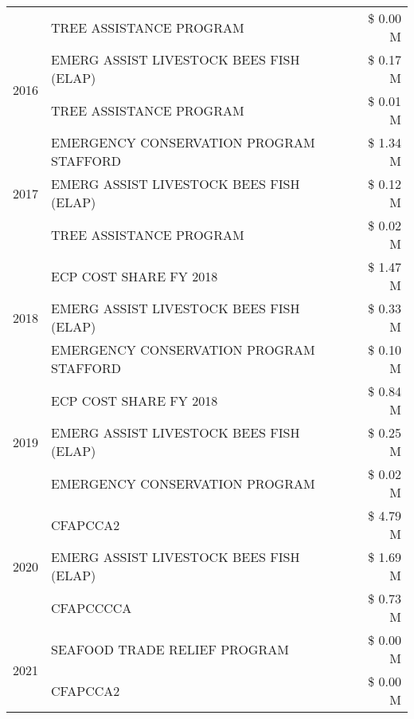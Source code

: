 \begin{tabular}{llr}
 & TREE ASSISTANCE PROGRAM & \$ 0.00 M \\
\cline{1-3}
\multirow[t]{2}{*}{2016} & EMERG ASSIST LIVESTOCK BEES FISH (ELAP)       & \$ 0.17 M \\
 & TREE ASSISTANCE PROGRAM                       & \$ 0.01 M \\
\cline{1-3}
\multirow[t]{3}{*}{2017} & EMERGENCY CONSERVATION PROGRAM STAFFORD & \$ 1.34 M \\
 & EMERG ASSIST LIVESTOCK BEES FISH (ELAP) & \$ 0.12 M \\
 & TREE ASSISTANCE PROGRAM & \$ 0.02 M \\
\cline{1-3}
\multirow[t]{3}{*}{2018} & ECP COST SHARE FY 2018 & \$ 1.47 M \\
 & EMERG ASSIST LIVESTOCK BEES FISH (ELAP) & \$ 0.33 M \\
 & EMERGENCY CONSERVATION PROGRAM STAFFORD & \$ 0.10 M \\
\cline{1-3}
\multirow[t]{3}{*}{2019} & ECP COST SHARE FY 2018 & \$ 0.84 M \\
 & EMERG ASSIST LIVESTOCK BEES FISH (ELAP) & \$ 0.25 M \\
 & EMERGENCY CONSERVATION PROGRAM & \$ 0.02 M \\
\cline{1-3}
\multirow[t]{3}{*}{2020} & CFAPCCA2 & \$ 4.79 M \\
 & EMERG ASSIST LIVESTOCK BEES FISH (ELAP) & \$ 1.69 M \\
 & CFAPCCCCA & \$ 0.73 M \\
\cline{1-3}
\multirow[t]{2}{*}{2021} & SEAFOOD TRADE RELIEF PROGRAM & \$ 0.00 M \\
 & CFAPCCA2 & \$ 0.00 M \\
\cline{1-3}
\bottomrule
\end{tabular}
